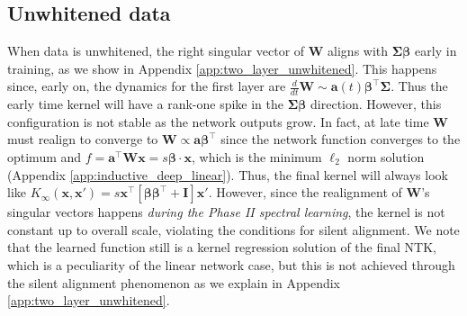 \documentclass{article} %
\def\x{\bm x}
\begin{document}
\subsection{Unwhitened data}\label{sec:unwhite_two_layer}
When data is unwhitened, the right singular vector of $\bm W$ aligns with $\bm\Sigma \bm \beta$ early in training, as we show in Appendix \ref{app:two_layer_unwhitened}. This happens since, early on, the dynamics for the first layer are $\frac{d}{dt} \bm W \sim \bm a(t) \bm\beta^\top \bm\Sigma$. Thus the early time kernel will have a rank-one spike in the $\bm \Sigma \bm \beta$ direction. However, this configuration is not stable as the network outputs grow. In fact, at late time $\bm W$ must realign to converge to $\bm W \propto \bm a \bm \beta^\top$ since the network function converges to the optimum and $f = \bm a^\top \bm W \x = s \bm\beta \cdot \x$, which is the minimum $\ell_2$ norm solution (Appendix \ref{app:inductive_deep_linear}). Thus, the final kernel will always look like $K_{\infty}(\x,\x') = s \x^\top \left[\bm \beta \bm\beta^\top +  \bm I \right] \x'$. However, since the realignment of $\bm W$'s singular vectors happens \textit{during the Phase II spectral learning}, the kernel is not constant up to overall scale, violating the conditions for silent alignment. We note that the learned function still is a kernel regression solution of the final NTK, which is a peculiarity of the linear network case, but this is not achieved through the silent alignment phenomenon as we explain in Appendix \ref{app:two_layer_unwhitened}.
\end{document}
